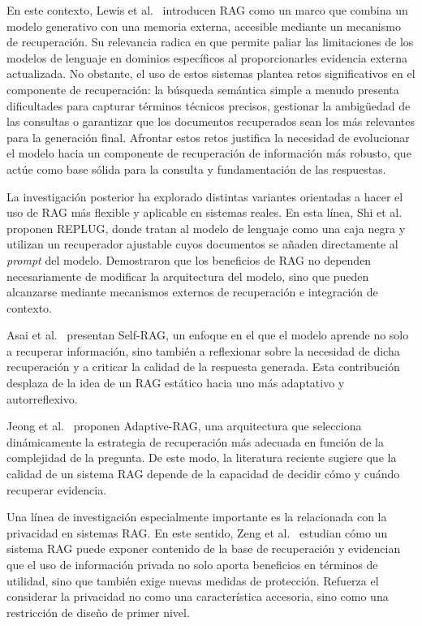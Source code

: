 En este contexto, Lewis et al.\ \cite{lewis2020rag} introducen RAG como un marco que combina un modelo generativo con una memoria externa, accesible mediante un mecanismo de recuperación. 
Su relevancia radica en que permite paliar las limitaciones de los modelos de lenguaje en dominios específicos al proporcionarles evidencia externa actualizada. 
No obstante, el uso de estos sistemas plantea retos significativos en el componente de recuperación: la búsqueda semántica simple a menudo presenta dificultades para capturar términos técnicos precisos, gestionar la ambigüedad de las consultas o garantizar que los documentos recuperados sean los más relevantes para la generación final. 
Afrontar estos retos justifica la necesidad de evolucionar el modelo hacia un componente de recuperación de información más robusto, que actúe como base sólida para la consulta y fundamentación de las respuestas.

La investigación posterior ha explorado distintas variantes orientadas a hacer el uso de RAG más flexible y aplicable en sistemas reales. 
En esta línea, Shi et al.\ \cite{shi2024replug} proponen REPLUG, donde tratan al modelo de lenguaje como una caja negra y utilizan un recuperador ajustable cuyos documentos se añaden directamente al \textit{prompt} del modelo.
Demostraron que los beneficios de RAG no dependen necesariamente de modificar la arquitectura del modelo, sino que pueden alcanzarse mediante mecanismos externos de recuperación e integración de contexto. 

Asai et al.\ \cite{asai2024selfrag} presentan Self-RAG, un enfoque en el que el modelo aprende no solo a recuperar información, sino también a reflexionar sobre la necesidad de dicha recuperación y a criticar la calidad de la respuesta generada. 
Esta contribución desplaza de la idea de un RAG estático hacia uno más adaptativo y autorreflexivo. 

Jeong et al.\ \cite{jeong2024adaptiverag} proponen Adaptive-RAG, una arquitectura que selecciona dinámicamente la estrategia de recuperación más adecuada en función de la complejidad de la pregunta. 
De este modo, la literatura reciente sugiere que la calidad de un sistema RAG depende de la capacidad de decidir cómo y cuándo recuperar evidencia.

Una línea de investigación especialmente importante es la relacionada con la privacidad en sistemas RAG. 
En este sentido, Zeng et al.\ \cite{zeng2024ragprivacy} estudian cómo un sistema RAG puede exponer contenido de la base de recuperación y evidencian que el uso de información privada no solo aporta beneficios en términos de utilidad, sino que también exige nuevas medidas de protección. 
Refuerza el considerar la privacidad no como una característica accesoria, sino como una restricción de diseño de primer nivel.

